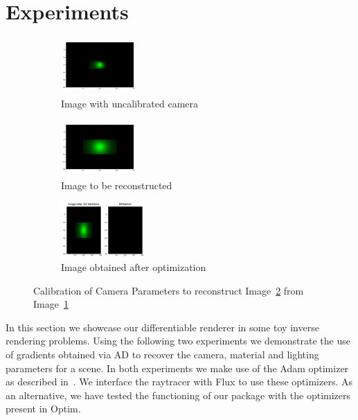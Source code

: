 \documentclass{juliacon}
\begin{document}
\section{Experiments}

\begin{figure}[!htb]
    \centering
    \begin{subfigure}[c]{0.26\textwidth}
        \centering
        \includegraphics[width=107px, height=80px]{images/camera/initial_guess_image.png}
        \caption{Image with uncalibrated camera}
        \label{fig:cam_guess}
    \end{subfigure}
    \hfill
    \begin{subfigure}[c]{0.26\textwidth}
        \centering          
        \includegraphics[width=107px, height=80px]{images/camera/target_image.png}
        \caption{Image to be reconstructed}
        \label{fig:cam_target}
    \end{subfigure}
    \centering
    \begin{subfigure}[c]{0.47\textwidth}
        \centering
        \includegraphics[width=\textwidth, height=80px]{images/camera/iter_120.png}
        \caption{Image obtained after optimization}
    \end{subfigure}
    \caption{Calibration of Camera Parameters to reconstruct Image~\ref{fig:cam_target} from Image~\ref{fig:cam_guess}}
    \label{fig:cam_invrender}
\end{figure}

In this section we showcase our differentiable renderer in some toy inverse rendering problems. Using the following two experiments we demonstrate the use of gradients obtained via AD to recover the camera, material and lighting parameters for a scene. In both experiments we make use of the Adam optimizer as described in~\cite{kingma2014adam}. We interface the raytracer with Flux to use these optimizers. As an alternative, we have tested the functioning of our package with the optimizers present in Optim.
\end{document}
